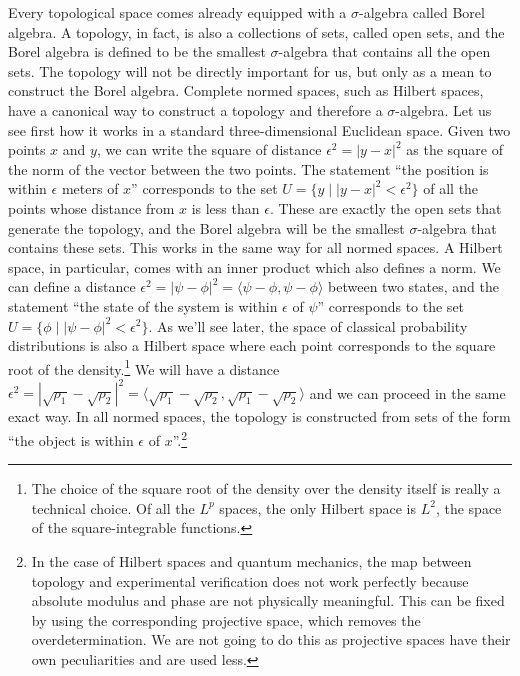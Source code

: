 \documentclass[11pt, executivepaper]{article}
\begin{document}
Every topological space comes already equipped with a $\sigma$-algebra called Borel algebra. A topology, in fact, is also a collections of sets, called open sets, and the Borel algebra is defined to be the smallest $\sigma$-algebra that contains all the open sets. The topology will not be directly important for us, but only as a mean to construct the Borel algebra. Complete normed spaces, such as Hilbert spaces, have a canonical way to construct a topology and therefore a $\sigma$-algebra. Let us see first how it works in a standard three-dimensional Euclidean space. Given two points $x$ and $y$, we can write the square of distance $\epsilon^2 = |y - x|^2$ as the square of the norm of the vector between the two points. The statement ``the position is within $\epsilon$ meters of $x$'' corresponds to the set $U = \{y \; | \; |y - x|^2 < \epsilon^2 \}$ of all the points whose distance from $x$ is less than $\epsilon$. These are exactly the open sets that generate the topology, and the Borel algebra will be the smallest $\sigma$-algebra that contains these sets. This works in the same way for all normed spaces. A Hilbert space, in particular, comes with an inner product which also defines a norm. We can define a distance $\epsilon^2 = |\psi - \phi|^2=\langle \psi - \phi , \psi - \phi \rangle$ between two states, and the statement ``the state of the system is within $\epsilon$ of $\psi$'' corresponds to the set $U = \{\phi \; | \; |\psi - \phi|^2 < \epsilon^2\}$. As we'll see later, the space of classical probability distributions is also a Hilbert space where each point corresponds to the square root of the density.\footnote{The choice of the square root of the density over the density itself is really a technical choice. Of all the $L^p$ spaces, the only Hilbert space is $L^2$, the space of the square-integrable functions.} We will have a distance $\epsilon^2 = |\sqrt{\rho_1} - \sqrt{\rho_2}|^2=\langle \sqrt{\rho_1} - \sqrt{\rho_2} , \sqrt{\rho_1} - \sqrt{\rho_2} \rangle$ and we can proceed in the same exact way. In all normed spaces, the topology is constructed from sets of the form ``the object is within $\epsilon$ of $x$''.\footnote{In the case of Hilbert spaces and quantum mechanics, the map between topology and experimental verification does not work perfectly because absolute modulus and phase are not physically meaningful. This can be fixed by using the corresponding projective space, which removes the overdetermination. We are not going to do this as projective spaces have their own peculiarities and are used less.}
\end{document}
